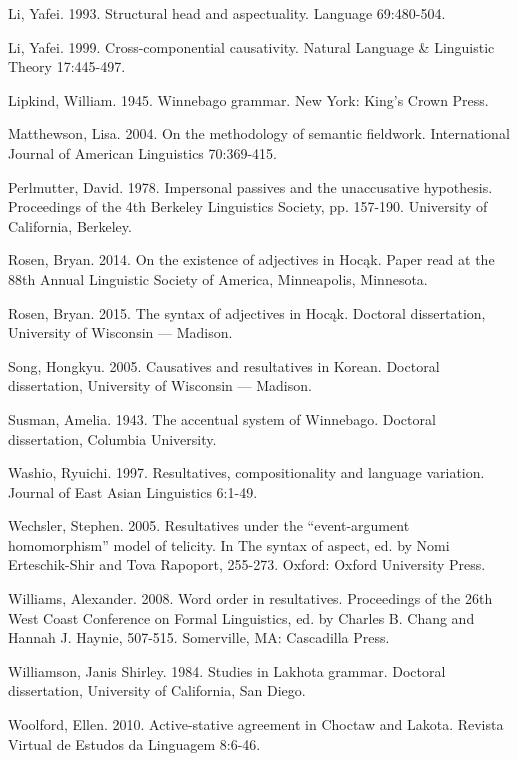 \documentclass[output=paper]{LSP/langsci}
\begin{document}
\begin{reflist}
Li, Yafei. 1993. Structural head and aspectuality. Language 69:480-504.

Li, Yafei. 1999. Cross-componential causativity. Natural Language \& Linguistic Theory 17:445-497.

Lipkind, William. 1945. Winnebago grammar. New York: King's Crown Press.

Matthewson, Lisa. 2004. On the methodology of semantic fieldwork. International Journal of American Linguistics 70:369-415.

Perlmutter, David. 1978. Impersonal passives and the unaccusative hypothesis. Proceedings of the 4th Berkeley Linguistics Society, pp. 157-190. University of California, Berkeley.

Rosen, Bryan. 2014. On the existence of adjectives in Hocąk. Paper read at the 88th Annual Linguistic Society of America, Minneapolis, Minnesota.

Rosen, Bryan. 2015. The syntax of adjectives in Hocąk. Doctoral dissertation, University of Wisconsin --- Madison.

Song, Hongkyu. 2005. Causatives and resultatives in Korean. Doctoral dissertation, University of Wisconsin --- Madison.

Susman, Amelia. 1943. The accentual system of Winnebago. Doctoral dissertation, Columbia University.

Washio, Ryuichi. 1997. Resultatives, compositionality and language variation. Journal of East Asian Linguistics 6:1-49.

Wechsler, Stephen. 2005. Resultatives under the ``event-argument homomorphism'' model of telicity. In The syntax of aspect, ed. by Nomi Erteschik-Shir and Tova Rapoport, 255-273. Oxford: Oxford University Press.

Williams, Alexander. 2008. Word order in resultatives. Proceedings of the 26th West Coast Conference on Formal Linguistics, ed. by Charles B. Chang and Hannah J. Haynie, 507-515. Somerville, MA: Cascadilla Press.

Williamson, Janis Shirley. 1984. Studies in Lakhota grammar. Doctoral dissertation, University of California, San Diego.

Woolford, Ellen. 2010. Active-stative agreement in Choctaw and Lakota. Revista Virtual de Estudos da Linguagem 8:6-46.

\end{reflist}
\end{document}
